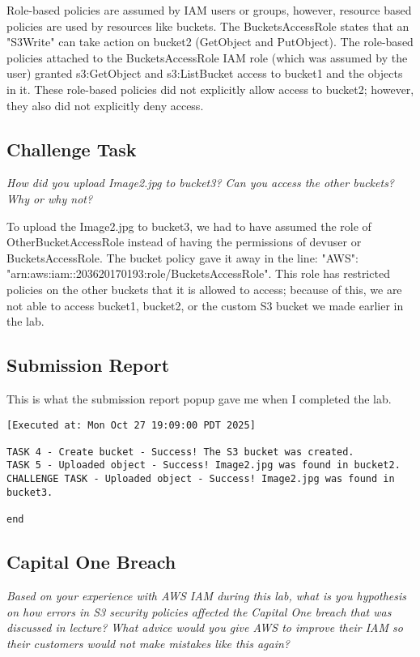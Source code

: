 \documentclass[11pt]{article}
\begin{document}
Role-based policies are assumed by IAM users or groups, however, resource based policies are used by resources like buckets. The BucketsAccessRole states that an "S3Write" can take action on bucket2 (GetObject and PutObject). The role-based policies attached to the BucketsAccessRole IAM role (which was assumed by the user) granted s3:GetObject and s3:ListBucket access to bucket1 and the objects in it. These role-based policies did not explicitly allow access to bucket2; however, they also did not explicitly deny access.


\subsection*{Challenge Task}
\textit{How did you upload Image2.jpg to bucket3? Can you access the other buckets? Why or why not?}

To upload the Image2.jpg to bucket3, we had to have assumed the role of OtherBucketAccessRole instead of having the permissions of devuser or BucketsAccessRole. The bucket policy gave it away in the line: "AWS": "arn:aws:iam::203620170193:role/BucketsAccessRole". This role has restricted policies on the other buckets that it is allowed to access; because of this, we are not able to access bucket1, bucket2, or the custom S3 bucket we made earlier in the lab.

\subsection*{Submission Report}
This is what the submission report popup gave me when I completed the lab.
\begin{verbatim}
[Executed at: Mon Oct 27 19:09:00 PDT 2025]

TASK 4 - Create bucket - Success! The S3 bucket was created.
TASK 5 - Uploaded object - Success! Image2.jpg was found in bucket2.
CHALLENGE TASK - Uploaded object - Success! Image2.jpg was found in bucket3.

end
\end{verbatim}

\subsection*{Capital One Breach}
\textit{Based on your experience with AWS IAM during this lab, what is you hypothesis on how errors in S3 security policies affected the Capital One breach that was discussed in lecture? What advice would you give AWS to improve their IAM so their customers would not make mistakes like this again?}
\end{document}
